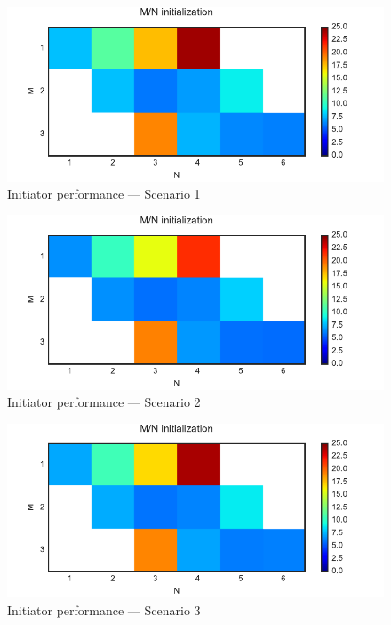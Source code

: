 \begin{figure}
 \centering
 \includegraphics{Figures/plots/Scenario1_Init-Performance.pdf}
 \caption{Initiator performance --- Scenario 1}\label{fig:init_performance_scenario1}
\end{figure}
\begin{figure}
 \centering
 \includegraphics{Figures/plots/Scenario2_Init-Performance.pdf}
 \caption{Initiator performance --- Scenario 2}\label{fig:init_performance_scenario2}
\end{figure}
\begin{figure}
 \centering
 \includegraphics{Figures/plots/Scenario3_Init-Performance.pdf}
 \caption{Initiator performance --- Scenario 3}\label{fig:init_performance_scenario3}
\end{figure}
